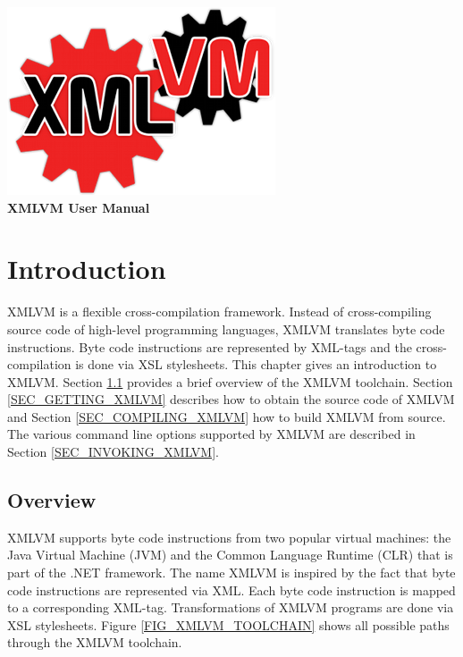 \documentclass[11pt]{book}
\begin{document}
\begin{titlepage}
\begin{center}
\includegraphics{pics/xmlvm_logo.png}
\Huge
\\[3cm]
\textbf{XMLVM User Manual}
\normalsize
\end{center}
\end{titlepage}

\tableofcontents


\chapter{Introduction}

XMLVM is a flexible cross-compilation framework. Instead of
cross-compiling source code of high-level programming languages, XMLVM
translates byte code instructions. Byte code instructions are
represented by XML-tags and the cross-compilation is done via XSL
stylesheets. This chapter gives an introduction to XMLVM. Section
\ref{SEC_OVERVIEW} provides a brief overview of the XMLVM toolchain.
Section \ref{SEC_GETTING_XMLVM} describes how to obtain the source
code of XMLVM and Section \ref{SEC_COMPILING_XMLVM} how to build XMLVM
from source. The various command line options supported by XMLVM are
described in Section \ref{SEC_INVOKING_XMLVM}.


\section{Overview}
\label{SEC_OVERVIEW}

XMLVM supports byte code instructions from two popular virtual
machines: the Java Virtual Machine (JVM) and the Common Language
Runtime (CLR) that is part of the .NET framework. The name XMLVM is
inspired by the fact that byte code instructions are represented via
XML. Each byte code instruction is mapped to a corresponding XML-tag.
Transformations of XMLVM programs are done via XSL stylesheets. Figure
\ref{FIG_XMLVM_TOOLCHAIN} shows all possible paths through the XMLVM
toolchain.
\end{document}
